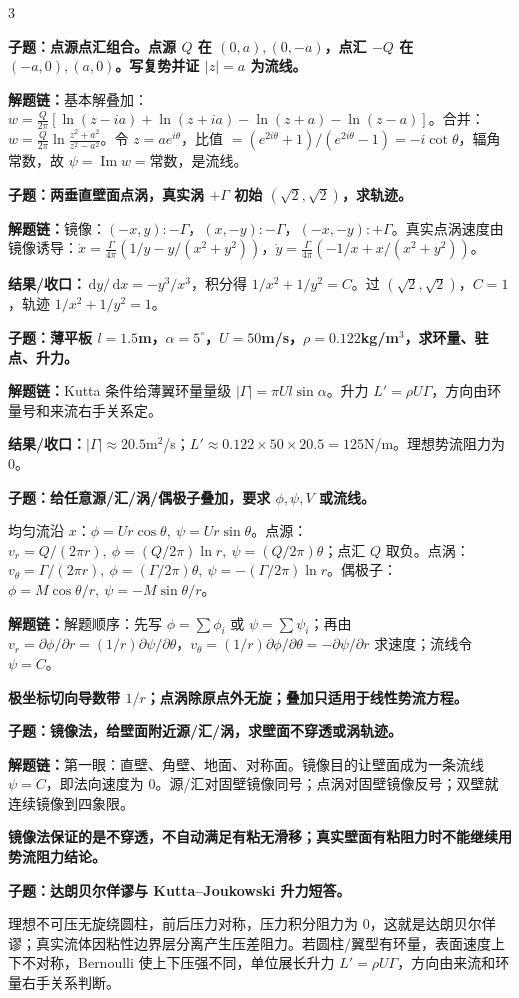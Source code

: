 \documentclass[a4paper]{article}
\newcommand{\qt}[1]{\vspace{0.10pt}\colorbox{Q}{\parbox{\dimexpr\linewidth-2\fboxsep}{\color{white}\bfseries #1}}\par}
\newcommand{\ans}[1]{\colorbox{G}{\parbox{\dimexpr\linewidth-2\fboxsep}{#1}}\par}
\newcommand{\warn}[1]{\colorbox{Y}{\parbox{\dimexpr\linewidth-2\fboxsep}{\color{E}\bfseries #1}}\par}
\newcommand{\chain}[1]{{\color{A}\bfseries 解题链：}#1\par}
\newcommand{\res}[1]{{\color{E}\bfseries 结果/收口：}#1\par}
\newcommand{\dd}{\,\mathrm d}
\begin{document}
\begin{multicols}{3}
\qt{子题：点源点汇组合。点源 $Q$ 在 $(0,a),(0,-a)$，点汇 $-Q$ 在 $(-a,0),(a,0)$。写复势并证 $|z|=a$ 为流线。}
\chain{基本解叠加：$w=\frac{Q}{2\pi}[\ln(z-ia)+\ln(z+ia)-\ln(z+a)-\ln(z-a)]$。合并：$w=\frac{Q}{2\pi}\ln\frac{z^2+a^2}{z^2-a^2}$。令 $z=ae^{i\theta}$，比值 $=(e^{2i\theta}+1)/(e^{2i\theta}-1)=-i\cot\theta$，辐角常数，故 $\psi=\operatorname{Im}w=$常数，是流线。}

\qt{子题：两垂直壁面点涡，真实涡 $+\Gamma$ 初始 $(\sqrt2,\sqrt2)$，求轨迹。}
\chain{镜像：$(-x,y):-\Gamma$，$(x,-y):-\Gamma$，$(-x,-y):+\Gamma$。真实点涡速度由镜像诱导：$\dot x=\frac{\Gamma}{4\pi}(1/y-y/(x^2+y^2))$，$\dot y=\frac{\Gamma}{4\pi}(-1/x+x/(x^2+y^2))$。}
\res{$\dd y/\dd x=-y^3/x^3$，积分得 $1/x^2+1/y^2=C$。过 $(\sqrt2,\sqrt2)$，$C=1$，轨迹 $1/x^2+1/y^2=1$。}

\qt{子题：薄平板 $l=1.5$m，$\alpha=5^\circ$，$U=50$m/s，$\rho=0.122$kg/m$^3$，求环量、驻点、升力。}
\chain{Kutta 条件给薄翼环量量级 $|\Gamma|=\pi Ul\sin\alpha$。升力 $L'=\rho U\Gamma$，方向由环量号和来流右手关系定。}
\res{$|\Gamma|\approx20.5$m$^2$/s；$L'\approx0.122\times50\times20.5=125$N/m。理想势流阻力为 0。}

\qt{子题：给任意源/汇/涡/偶极子叠加，要求 $\phi,\psi,V$ 或流线。}
\ans{均匀流沿 $x$：$\phi=Ur\cos\theta,\ \psi=Ur\sin\theta$。点源：$v_r=Q/(2\pi r),\ \phi=(Q/2\pi)\ln r,\ \psi=(Q/2\pi)\theta$；点汇 $Q$ 取负。点涡：$v_\theta=\Gamma/(2\pi r),\ \phi=(\Gamma/2\pi)\theta,\ \psi=-(\Gamma/2\pi)\ln r$。偶极子：$\phi=M\cos\theta/r,\ \psi=-M\sin\theta/r$。}
\chain{解题顺序：先写 $\phi=\sum\phi_i$ 或 $\psi=\sum\psi_i$；再由 $v_r=\partial\phi/\partial r=(1/r)\partial\psi/\partial\theta$，$v_\theta=(1/r)\partial\phi/\partial\theta=-\partial\psi/\partial r$ 求速度；流线令 $\psi=C$。}
\warn{极坐标切向导数带 $1/r$；点涡除原点外无旋；叠加只适用于线性势流方程。}

\qt{子题：镜像法，给壁面附近源/汇/涡，求壁面不穿透或涡轨迹。}
\chain{第一眼：直壁、角壁、地面、对称面。镜像目的让壁面成为一条流线 $\psi=C$，即法向速度为 0。源/汇对固壁镜像同号；点涡对固壁镜像反号；双壁就连续镜像到四象限。}
\warn{镜像法保证的是不穿透，不自动满足有粘无滑移；真实壁面有粘阻力时不能继续用势流阻力结论。}

\qt{子题：达朗贝尔佯谬与 Kutta--Joukowski 升力短答。}
\ans{理想不可压无旋绕圆柱，前后压力对称，压力积分阻力为 0，这就是达朗贝尔佯谬；真实流体因粘性边界层分离产生压差阻力。若圆柱/翼型有环量，表面速度上下不对称，Bernoulli 使上下压强不同，单位展长升力 $L'=\rho U\Gamma$，方向由来流和环量右手关系判断。}



\end{multicols}
\end{document}

